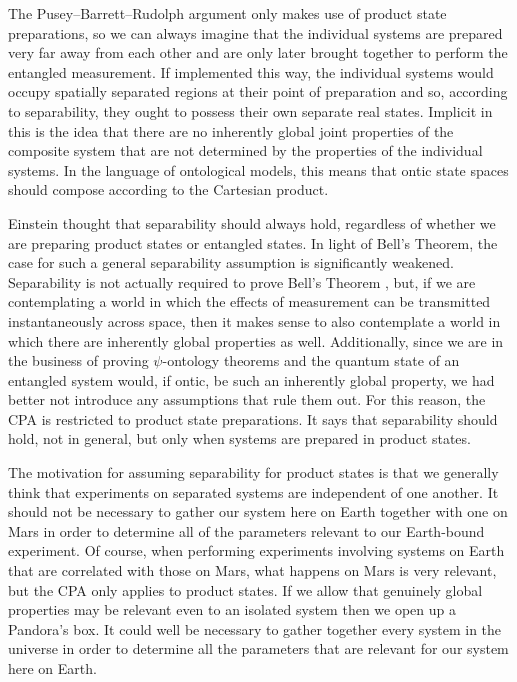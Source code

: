 \documentclass[DIV=calc,fontsize=12pt]{scrartcl} %
\theoremstyle{definition}
\theoremstyle{plain}
\begin{document}
The Pusey--Barrett--Rudolph argument only makes use of product state preparations, so we
can always imagine that the individual systems are prepared very far
away from each other and are only later brought together to perform
the entangled measurement.  If implemented this way, the individual
systems would occupy spatially separated regions at their point of
preparation and so, according to separability, they ought to possess
their own separate real states.  Implicit in this is the idea that
there are no inherently global joint properties of the composite
system that are not determined by the properties of the individual
systems.  In the language of ontological models, this means that ontic
state spaces should compose according to the Cartesian product.

Einstein thought that separability should always hold, regardless of
whether we are preparing product states or entangled states.  In light
of Bell's Theorem, the case for such a general separability assumption
is significantly weakened.  Separability is not actually required to
prove Bell's Theorem \cite{Henson2013}, but, if we are contemplating a
world in which the effects of measurement can be transmitted
instantaneously across space, then it makes sense to also contemplate
a world in which there are inherently global properties as well.
Additionally, since we are in the business of proving $\psi$-ontology
theorems and the quantum state of an entangled system would, if ontic,
be such an inherently global property, we had better not introduce any
assumptions that rule them out.  For this reason, the CPA is
restricted to product state preparations.  It says that separability
should hold, not in general, but only when systems are prepared in
product states.

The motivation for assuming separability for product states is that we
generally think that experiments on separated systems are independent
of one another.  It should not be necessary to gather our system here
on Earth together with one on Mars in order to determine all of the
parameters relevant to our Earth-bound experiment.  Of course, when
performing experiments involving systems on Earth that are correlated
with those on Mars, what happens on Mars is very relevant, but the CPA
only applies to product states.  If we allow that genuinely global
properties may be relevant even to an isolated system then we open up
a Pandora's box.  It could well be necessary to gather together every
system in the universe in order to determine all the parameters that
are relevant for our system here on Earth.
\end{document}
